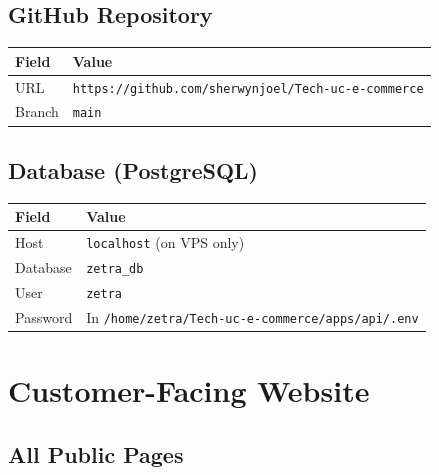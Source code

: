 \documentclass[12pt,a4paper]{article}
\begin{document}
\subsection{GitHub Repository}

\begin{tabular}{@{}L{4cm} L{9cm}@{}}
\toprule
\textbf{Field} & \textbf{Value} \\
\midrule
URL & \texttt{https://github.com/sherwynjoel/Tech-uc-e-commerce} \\
Branch & \texttt{main} \\
\bottomrule
\end{tabular}

\subsection{Database (PostgreSQL)}

\begin{tabular}{@{}L{4cm} L{9cm}@{}}
\toprule
\textbf{Field} & \textbf{Value} \\
\midrule
Host & \texttt{localhost} (on VPS only) \\
Database & \texttt{zetra\_db} \\
User & \texttt{zetra} \\
Password & In \texttt{/home/zetra/Tech-uc-e-commerce/apps/api/.env} \\
\bottomrule
\end{tabular}

\section{Customer-Facing Website}

\subsection{All Public Pages}
\end{document}
